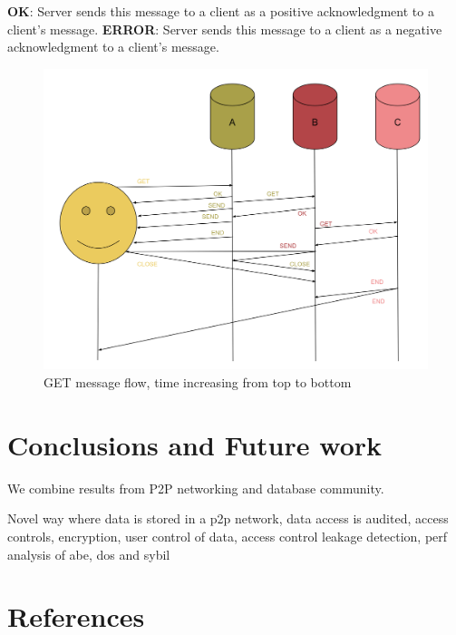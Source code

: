 \documentclass[preprint,10pt]{elsarticle}
\newcommand{\fscale}[1]{#1\linewidth}
\theoremstyle{definition}
\begin{document}
\newline
\newline
\textbf{OK}: Server sends this message to a client as a positive acknowledgment to a client's message.
\newline
\newline
\textbf{ERROR}: Server sends this message to a client as a negative acknowledgment to a client's message.
\begin{figure}[h!] \centering
	\includegraphics[width=\fscale{1}]{mx.png}
	\caption{GET message flow, time increasing from top to bottom}
	\label{fig:mx}
\end{figure}

\section{Conclusions and Future work}
We combine results from P2P networking and database community.

Novel way where data is stored in a p2p network, data access is audited, access controls, encryption, user control of data, access control leakage detection,  perf analysis of abe, dos and sybil
\section{References}



\end{document}
